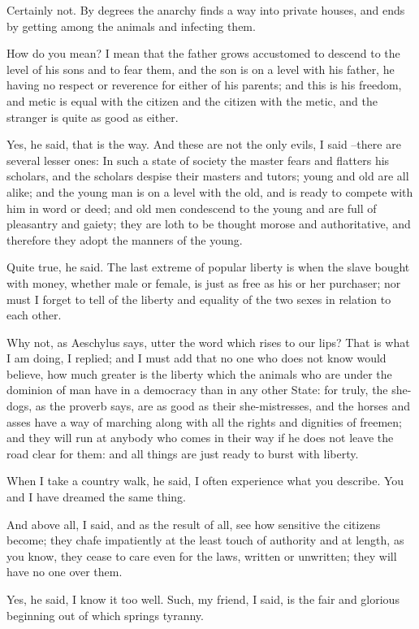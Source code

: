 Certainly not.
By degrees the anarchy finds a way into private houses, and ends by getting among the animals and infecting them.

How do you mean?
I mean that the father grows accustomed to descend to the level of his sons and to fear them, and the son is on a level with his father, he having no respect or reverence for either of his parents; and this is his freedom, and metic is equal with the citizen and the citizen with the metic, and the stranger is quite as good as either.

Yes, he said, that is the way.
And these are not the only evils, I said --there are several lesser ones: In such a state of society the master fears and flatters his scholars, and the scholars despise their masters and tutors; young and old are all alike; and the young man is on a level with the old, and is ready to compete with him in word or deed; and old men condescend to the young and are full of pleasantry and gaiety; they are loth to be thought morose and authoritative, and therefore they adopt the manners of the young.

Quite true, he said.
The last extreme of popular liberty is when the slave bought with money, whether male or female, is just as free as his or her purchaser; nor must I forget to tell of the liberty and equality of the two sexes in relation to each other.

Why not, as Aeschylus says, utter the word which rises to our lips?
That is what I am doing, I replied; and I must add that no one who does not know would believe, how much greater is the liberty which the animals who are under the dominion of man have in a democracy than in any other State: for truly, the she-dogs, as the proverb says, are as good as their she-mistresses, and the horses and asses have a way of marching along with all the rights and dignities of freemen; and they will run at anybody who comes in their way if he does not leave the road clear for them: and all things are just ready to burst with liberty.

When I take a country walk, he said, I often experience what you describe. You and I have dreamed the same thing.

And above all, I said, and as the result of all, see how sensitive the citizens become; they chafe impatiently at the least touch of authority and at length, as you know, they cease to care even for the laws, written or unwritten; they will have no one over them.

Yes, he said, I know it too well.
Such, my friend, I said, is the fair and glorious beginning out of which springs tyranny.

